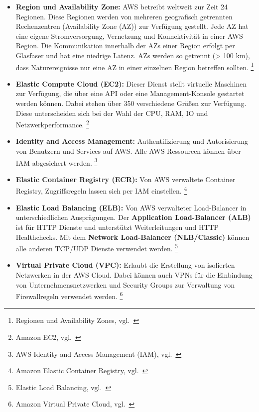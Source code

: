 \begin{itemize}
    \item \textbf{Region und Availability Zone:}
    AWS betreibt weltweit zur Zeit 24 Regionen.
    Diese Regionen werden von mehreren geografisch getrennten Rechenzentren (Availability Zone (AZ)) zur Verfügung gestellt.
    Jede AZ hat eine eigene Stromversorgung, Vernetzung und Konnektivität in einer AWS Region.
    Die Kommunikation innerhalb der AZs einer Region erfolgt per Glasfaser und hat eine niedrige Latenz.
    AZs werden so getrennt (> 100 km), dass Naturereignisse nur eine AZ in einer einzelnen Region betreffen sollten.
    \footnote{{Regionen und Availability Zones, vgl.~\cite{AWS_REGIONS_AND_AZS}}}

    \item \textbf{Elastic Compute Cloud (EC2):}
    Dieser Dienst stellt virtuelle Maschinen zur Verfügung, die über eine API oder eine Management-Konsole gestartet werden können.
    Dabei stehen über 350 verschiedene Größen zur Verfügung.
    Diese unterscheiden sich bei der Wahl der CPU, RAM, IO und Netzwerkperformance.
    \footnote{{Amazon EC2, vgl.~\cite{AWS_EC2}}}

    \item \textbf{Identity and Access Management:}
    Authentifizierung und Autorisierung von Benutzern und Services auf AWS. Alle AWS Ressourcen können über IAM abgesichert werden.
    \footnote{{AWS Identity and Access Management (IAM), vgl.~\cite{AWS_IAM}}}

    \item \textbf{Elastic Container Registry (ECR):}
    Von AWS verwaltete Container Registry, Zugriffsregeln lassen sich per IAM einstellen.
    \footnote{{Amazon Elastic Container Registry, vgl.~\cite{AWS_ECR}}}

    \item \textbf{Elastic Load Balancing (ELB):}
    Von AWS verwalteter Load-Balancer in unterschiedlichen Ausprägungen.
    Der \textbf{Application Load-Balancer (ALB)} ist für HTTP Dienste und unterstützt Weiterleitungen und HTTP Healthchecks.
    Mit dem \textbf{Network Load-Balancer (NLB/Classic)} können alle anderen TCP/UDP Dienste verwendet werden.
    \footnote{{Elastic Load Balancing, vgl.~\cite{AWS_ELB}}}

    \item \textbf{Virtual Private Cloud (VPC):}
    Erlaubt die Erstellung von isolierten Netzwerken in der AWS Cloud.
    Dabei können auch VPNs für die Einbindung von Unternehmensnetzwerken und Security Groups zur Verwaltung von Firewallregeln verwendet werden.
    \footnote{{Amazon Virtual Private Cloud, vgl.~\cite{AWS_VPC}}}

\end{itemize}

